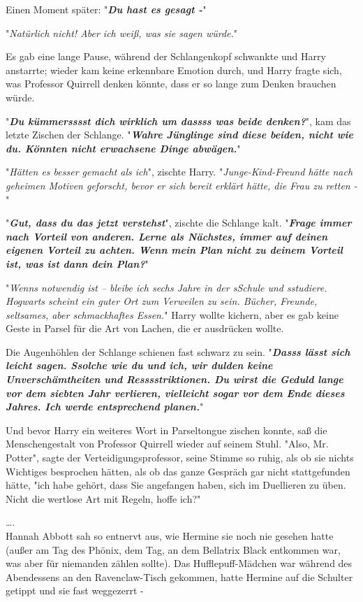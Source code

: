 {Einen Moment später: "\textbf{\emph{Du hast es gesagt -}}"

"\emph{Natürlich nicht! Aber ich weiß, was sie sagen würde.}"

Es gab eine lange Pause, während der Schlangenkopf schwankte und Harry anstarrte; wieder kam keine erkennbare Emotion durch, und Harry fragte sich, was Professor Quirrell denken könnte, dass er so lange zum Denken brauchen würde.

"\textbf{\emph{Du kümmersssst dich wirklich um dassss was beide denken?}}", kam das letzte Zischen der Schlange. "\textbf{\emph{Wahre Jünglinge sind diese beiden, nicht wie du. Könnten nicht erwachsene Dinge abwägen.}}"

"\emph{Hätten es besser gemacht als ich}", zischte Harry. "\emph{Junge-Kind-Freund hätte nach geheimen Motiven geforscht, bevor er sich bereit erklärt hätte, die Frau zu retten -}"

"\textbf{\emph{Gut, dass du das jetzt verstehst}}", zischte die Schlange kalt. "\textbf{\emph{Frage immer nach Vorteil von anderen. Lerne als Nächstes, immer auf deinen eigenen Vorteil zu achten. Wenn mein Plan nicht zu deinem Vorteil ist, was ist dann dein Plan?}}"

"\emph{Wenns notwendig ist -- bleibe ich sechs Jahre in der sSchule und sstudiere. Hogwarts scheint ein guter Ort zum Verweilen zu sein. Bücher, Freunde, seltsames, aber schmackhaftes Essen.}" Harry wollte kichern, aber es gab keine Geste in Parsel für die Art von Lachen, die er ausdrücken wollte.

Die Augenhöhlen der Schlange schienen fast schwarz zu sein. "\textbf{\emph{Dasss lässt sich leicht sagen. Ssolche wie du und ich, wir dulden keine Unverschämtheiten und Resssstriktionen. Du wirst die Geduld lange vor dem siebten Jahr verlieren, vielleicht sogar vor dem Ende dieses Jahres. Ich werde entsprechend planen.}}"

Und bevor Harry ein weiteres Wort in Parseltongue zischen konnte, saß die Menschengestalt von Professor Quirrell wieder auf seinem Stuhl. "Also, Mr. Potter", sagte der Verteidigungsprofessor, seine Stimme so ruhig, als ob sie nichts Wichtiges besprochen hätten, als ob das ganze Gespräch gar nicht stattgefunden hätte, "ich habe gehört, dass Sie angefangen haben, sich im Duellieren zu üben. Nicht die wertlose Art mit Regeln, hoffe ich?"

….\\ Hannah Abbott sah so entnervt aus, wie Hermine sie noch nie gesehen hatte (außer am Tag des Phönix, dem Tag, an dem Bellatrix Black entkommen war, was aber für niemanden zählen sollte). Das Hufflepuff-Mädchen war während des Abendessens an den Ravenclaw-Tisch gekommen, hatte Hermine auf die Schulter getippt und sie fast weggezerrt -

}
